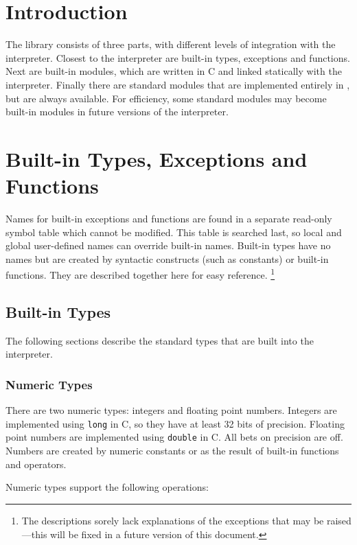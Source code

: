 \section{Introduction}

The {\Python} library consists of three parts, with different levels of
integration with the interpreter.
Closest to the interpreter are built-in types, exceptions and functions.
Next are built-in modules, which are written in C and linked statically
with the interpreter.
Finally there are standard modules that are implemented entirely in
{\Python}, but are always available.
For efficiency, some standard modules may become built-in modules in
future versions of the interpreter.

\section{Built-in Types, Exceptions and Functions}

Names for built-in exceptions and functions are found in a separate
read-only symbol table which cannot be modified.
This table is searched last, so local and global user-defined names can
override built-in names.
Built-in types have no names but are created by syntactic constructs
(such as constants) or built-in functions.
They are described together here for easy reference.%
\footnote{
The descriptions sorely lack explanations of the exceptions that
may be raised---this will be fixed in a future version of this
document.
}

\subsection{Built-in Types}

The following sections describe the standard types that are built into the
interpreter.
\subsubsection{Numeric Types}

There are two numeric types: integers and floating point numbers.
Integers are implemented using {\tt long} in C, so they have at least 32
bits of precision.
Floating point numbers are implemented using {\tt double} in C.
All bets on precision are off.
Numbers are created by numeric constants or as the result of built-in
functions and operators.

Numeric types support the following operations:

